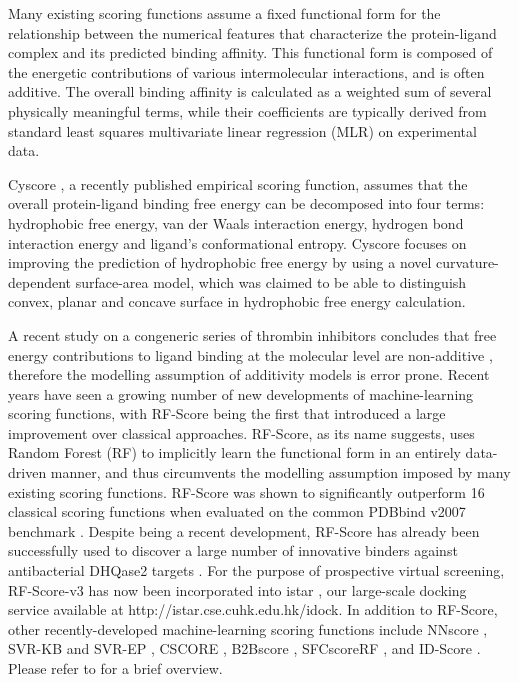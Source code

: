 \documentclass[linenumbers]{bmcart}
\begin{document}
Many existing scoring functions assume a fixed functional form for the relationship between the numerical features that characterize the protein-ligand complex and its predicted binding affinity. This functional form is composed of the energetic contributions of various intermolecular interactions, and is often additive. The overall binding affinity is calculated as a weighted sum of several physically meaningful terms, while their coefficients are typically derived from standard least squares multivariate linear regression (MLR) on experimental data.

Cyscore \cite{1372}, a recently published empirical scoring function, assumes that the overall protein-ligand binding free energy can be decomposed into four terms: hydrophobic free energy, van der Waals interaction energy, hydrogen bond interaction energy and ligand's conformational entropy. Cyscore focuses on improving the prediction of hydrophobic free energy by using a novel curvature-dependent surface-area model, which was claimed to be able to distinguish convex, planar and concave surface in hydrophobic free energy calculation.

A recent study on a congeneric series of thrombin inhibitors concludes that free energy contributions to ligand binding at the molecular level are non-additive \cite{1416}, therefore the modelling assumption of additivity models is error prone. Recent years have seen a growing number of new developments of machine-learning scoring functions, with RF-Score \cite{564} being the first that introduced a large improvement over classical approaches. RF-Score, as its name suggests, uses Random Forest (RF) \cite{1309} to implicitly learn the functional form in an entirely data-driven manner, and thus circumvents the modelling assumption imposed by many existing scoring functions. RF-Score was shown to significantly outperform 16 classical scoring functions when evaluated on the common PDBbind v2007 benchmark \cite{564}. Despite being a recent development, RF-Score has already been successfully used to discover a large number of innovative binders against antibacterial DHQase2 targets \cite{1281}. For the purpose of prospective virtual screening, RF-Score-v3 has now been incorporated into istar \cite{1362}, our large-scale docking service available at http://istar.cse.cuhk.edu.hk/idock. In addition to RF-Score, other recently-developed machine-learning scoring functions include NNscore \cite{997}, SVR-KB and SVR-EP \cite{963}, CSCORE \cite{1194}, B2Bscore \cite{1410}, SFCscoreRF \cite{1347}, and ID-Score \cite{1305}. Please refer to \cite{1373} for a brief overview.
\end{document}
